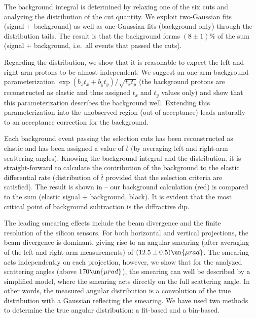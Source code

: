 The background integral is determined by relaxing one of the six cuts and analyzing the distribution of the cut quantity. We exploit two-Gaussian fits (signal + background) as well as one-Gaussian fits (background only) through the distribution tails. The result is that the background forms $(8\pm 1)\percent$ of the sum (signal + background, i.e.~all events that passed the cuts).

Regarding the distribution, we show that it is reasonable to expect the left and right-arm protons to be almost independent. We suggest an one-arm background parameterization $\exp(b_x t_x + b_y t_y) / \sqrt{t_x t_y}$ (the background protons are reconstructed as elastic and thus assigned $t_x$ and $t_y$ values only) and show that this parameterization describes the background well. Extending this parameterization into the unobserved region (out of acceptance) leads naturally to an acceptance correction for the background.

Each background event passing the selection cuts has been reconstructed as elastic and has been assigned a value of $\bar t$ (by averaging left and right-arm scattering angles). Knowing the background integral and the distribution, it is straight-forward to calculate the contribution of the background to the elastic differential rate (distribution of $\bar t$ provided that the selection criteria are satisfied). The result is shown in  -- our background calculation (red) is compared to the sum (elastic signal + background, black). It is evident that the most critical point of background subtraction is the diffractive dip.

\bmfig
{}
%
\emfig

The leading smearing effects include the beam divergence and the finite resolution of the silicon sensors. For both horizontal and vertical projections, the beam divergence is dominant, giving rise to an angular smearing (after averaging of the left and right-arm measurements) of $(12.5 \pm 0.5)\un{\mu rad}$. The smearing acts independently on each projection, however, we show that for the analyzed scattering angles (above $170\un{\mu rad}$), the smearing can well be described by a simplified model, where the smearing acts directly on the full scattering angle. In other words, the measured angular distribution is a convolution of the true distribution with a Gaussian reflecting the smearing. We have used two methods to determine the true angular distribution: a fit-based and a bin-based.

